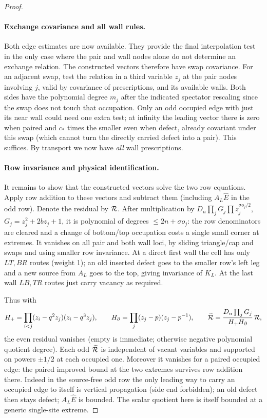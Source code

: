 \begin{proof}
\paragraph{Exchange covariance and all wall rules.}
Both edge estimates are now available. They provide the final interpolation
test in the only case where the pair and wall nodes alone do not determine
an exchange relation. The constructed vectors therefore have swap covariance. For an adjacent swap, test the relation in a third variable \(z_j\) at the pair nodes involving \(j\), valid by covariance of prescriptions, and its available walls. Both sides have the polynomial degree \(m_j\) after the indicated spectator rescaling since the swap does not touch that occupation. Only an odd occupied edge with just its near wall could need one extra test; at infinity the leading vector there is zero when paired and \(c_*\) times the smaller even when defect, already covariant under this swap (which cannot turn the directly carried defect into a pair). This suffices. By transport we now have \emph{all} wall prescriptions.

\paragraph{Row invariance and physical identification.}
It remains to show that the constructed vectors solve the two row equations.
Apply row addition to these vectors and subtract them (including \(A_L\widehat E\) in the odd row). Denote the residual by \({\cal R}\). After multiplication by \(D_n\prod_j G_j\prod z_j^{\sigma o_j/2}\), \(G_j=z_j^2+2b z_j+1\), it is polynomial of degrees \(\le 2n+\sigma o_j\): the row denominators are cleared and a change of bottom/top occupation costs a single small corner at extremes. It vanishes on all pair and both wall loci, by sliding triangle/cap and swaps and using smaller row invariance. At a direct first wall the cell has only \(LT,BR\) routes (weight 1); an old inserted defect goes to the smaller row's left leg and a new source from \(A_L\) goes to the top, giving invariance of \(K_L\). At the last wall \(LB,TR\) routes just carry vacancy as required.

Thus with
\[
 H_+=\prod_{i<j}(z_i-q^2 z_j)(z_i-q^3 z_j),\qquad
 H_\partial=\prod_j(z_j-p)(z_j-p^{-1}),\qquad
 \widetilde{\cal R}=\frac{D_n\prod_j G_j}{H_+ H_\partial}\,{\cal R},
\]
the even residual vanishes (empty is immediate; otherwise negative polynomial quotient degree). Each odd \(\widetilde{\cal R}\) is independent of vacant variables and supported on powers \(\pm1/2\) at each occupied one. Moreover it vanishes for a paired occupied edge: the paired improved bound at the two extremes survives row addition there. Indeed in the source-free odd row the only leading way to carry an occupied edge to itself is vertical propagation (side end forbidden); an old defect then stays defect; \(A_L\widehat E\) is bounded. The scalar quotient here is itself bounded at a generic single-site extreme.


\end{proof}
